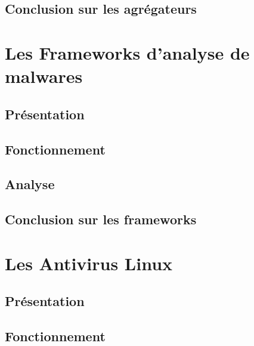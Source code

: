 \documentclass[smallextended]{svjour3}       %
\begin{document}
\subsection{Conclusion sur les agrégateurs}
\label{agrégateurs:conclusion}

\newpage
\section{Les Frameworks d'analyse de malwares}
\label{sec3:frameworks}

\subsection{Présentation}
\label{frameworks:présentation}

\subsection{Fonctionnement}
\label{frameworks:fonctionnement}

\subsection{Analyse}
\label{frameworks:analyse}

\subsection{Conclusion sur les frameworks}
\label{frameworks:conclusion}

\newpage
\section{Les Antivirus Linux}
\label{sec4:av}

\subsection{Présentation}
\label{av:présentation}

\subsection{Fonctionnement}
\label{av:fonctionnement}
\end{document}
